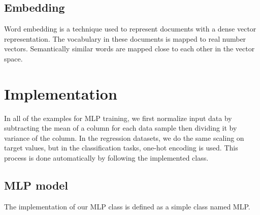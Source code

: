 \documentclass[10pt]{SelfArx} %
\begin{document}
	\subsection{Embedding}
	Word embedding is a technique used to represent documents with a dense vector representation. The vocabulary in these documents is mapped to real number vectors. Semantically similar words are mapped close to each other in the vector space. 
	
	
	\section{Implementation}
	
	In all of the examples for MLP training, we first normalize input data by subtracting the mean of a column for each data sample then dividing it by variance of the column. In the regression datasets, we do the same scaling on target values, but in the classification tasks, one-hot encoding is used.
	This process is done automatically by following the implemented class.
	
	\subsection{MLP model}
	
	The implementation of our MLP class is defined as a simple class named MLP.
	
\end{document}
